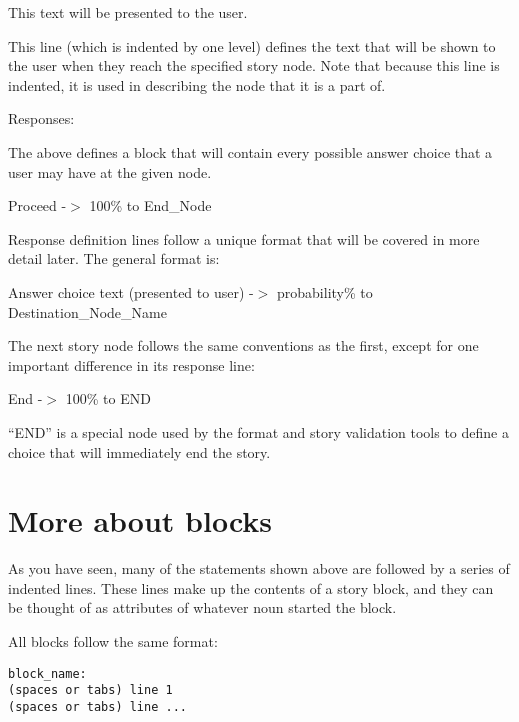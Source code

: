 \documentclass[12pt,letterpaper]{article}
\begin{document}
\begin{center}
This text will be presented to the user.
\end{center}

This line (which is indented by one level\footnotemark[2]) defines the text that will be shown to the user when they reach the specified story node. Note that because this line is indented, it is used in describing the node that it is a part of.


\begin{center}
Responses:
\end{center}

The above defines a block that will contain every possible answer choice that a user may have at the given node.

\begin{center}
Proceed -$>$ 100\% to End\_Node
\end{center}

Response definition lines follow a unique format that will be covered in more detail later. The general format is:
\begin{center}
Answer choice text (presented to user) -$>$ probability\% to Destination\_Node\_Name
\end{center}

The next story node follows the same conventions as the first, except for one important difference in its response line:
\begin{center}
End -$>$ 100\% to END
\end{center}

``END'' is a special node used by the format and story validation tools to define a choice that will immediately end the story.

\section{More about blocks}
As you have seen, many of the statements shown above are followed by a series of indented lines. These lines make up the contents of a story block, and they can be thought of as attributes of whatever noun started the block.

All blocks follow the same format:
\begin{lstlisting}[breaklines=true]
block_name:
(spaces or tabs) line 1
(spaces or tabs) line ...
\end{lstlisting}
\end{document}
